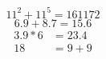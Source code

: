 \documentclass{article}
\begin{document}
	\begin{equation*}
		11^2 + 11^5 = 161172
	\end{equation*}
    \begin{equation*}
    	6.9 + 8.7 = 15.6
    \end{equation*}
    	\begin{align*}
    		3.9 * 6 &= 23.4\\
    		18 &= 9 + 9
       	\end{align*} 
\end{document}
